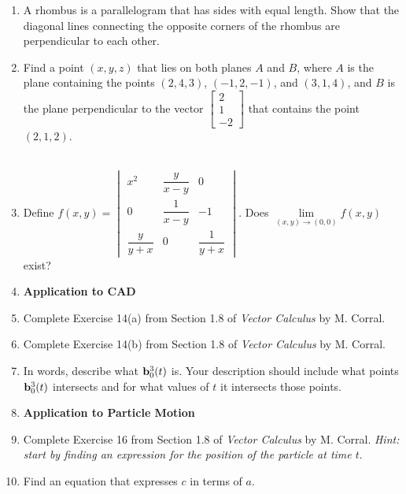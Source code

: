 \documentclass{article}
\begin{document}
\begin{enumerate}
\item 
A rhombus is a parallelogram that has sides with equal length. Show that the diagonal lines connecting the opposite corners of the rhombus are perpendicular to each other.
\item 
Find a point $(x, y, z)$ that lies on both planes $A$ and $B$,
where $A$ is the plane containing the points
$(2, 4, 3)$, $(-1, 2, -1)$, and $(3, 1, 4)$, and $B$ is the plane
perpendicular to the vector \(\begin{bmatrix} 2 \\ 1 \\ -2 
\end{bmatrix}\) that contains the point $(2, 1, 2)$.\\\\
\item %
Define \(f(x,y) = \begin{vmatrix}
                   x^2 & \dfrac{y}{x-y} & 0 \\
                   0 & \dfrac{1}{x-y} & -1 \\
                   \dfrac{y}{y+x} & 0 & \dfrac{1}{y+x}
                  \end{vmatrix}
\).  Does $\lim\limits_{(x,y) \to (0,0)}f(x,y)$ exist?
\item %
\textbf{Application to CAD}
\BEN
\item
Complete Exercise 14(a) from Section 1.8 of \textit{Vector Calculus} by M. Corral. 
\item
Complete Exercise 14(b) from Section 1.8 of \textit{Vector Calculus} by M. Corral. 
\item In words, describe what $\mathbf{b}_0^3(t)$ is. Your description should include what points $\mathbf{b}_0^3(t)$ intersects and for what values of $t$ it intersects those points.
\EEN
\item 
\textbf{Application to Particle Motion}
\BEN 
\item Complete Exercise 16 from Section 1.8 of \textit{Vector Calculus} by M. Corral. \textit{Hint: start by finding an expression for the position of the particle at time $t$}.
\item Find an equation that expresses $c$ in terms of $a$. 

\end{enumerate}
\end{document}
